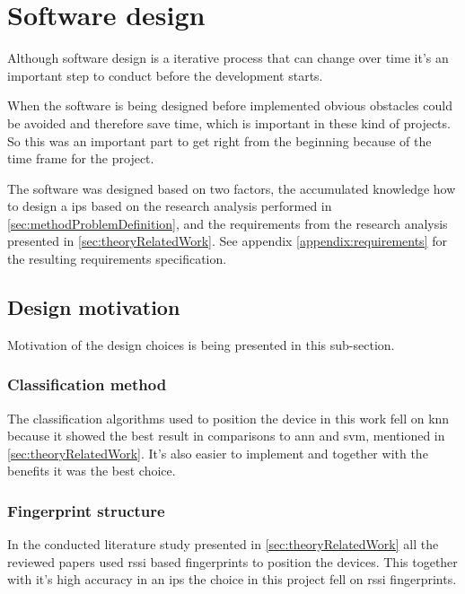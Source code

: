 \section{Software design}\label{sec:methodSoftwareDesign}
Although software design is a iterative process that can change over time it's  an important step to conduct before the development starts. \cite{EngineeringDesignIts1989, ImportanceBusinessProcess2008}

\bigskip

When the software is being designed before implemented obvious obstacles could be avoided and therefore save time, which is important in these kind of projects.
So this was an important part to get right from the beginning because of the time frame for the project.

\bigskip

The software was designed based on two factors, the accumulated knowledge how to design a \acrshort{ips} based on the research analysis performed in \cref{sec:methodProblemDefinition}, and the requirements from the research analysis presented in \cref{sec:theoryRelatedWork}.
See appendix \ref{appendix:requirements} for the resulting requirements specification.


\subsection{Design motivation}\label{sec:methodDesignMotivation}
Motivation of the design choices is being presented in this sub-section.


\subsubsection{Classification method}\label{sec:methodSoftwareDesignClassification}
The classification algorithms used to position the device in this work fell on \acrshort{knn} because it showed the best result in comparisons to \acrshort{ann} and \acrshort{svm}, mentioned in \cref{sec:theoryRelatedWork}.
It's also easier to implement and together with the benefits it was the best choice.


\subsubsection{Fingerprint structure}\label{sec:methodSoftwareDesignFingerprint}
In the conducted literature study presented in \cref{sec:theoryRelatedWork} all the reviewed papers used \acrfull{rssi} based fingerprints to position the devices.
This together with it's high accuracy in an \acrshort{ips} the choice in this project fell on \acrshort{rssi} fingerprints.


